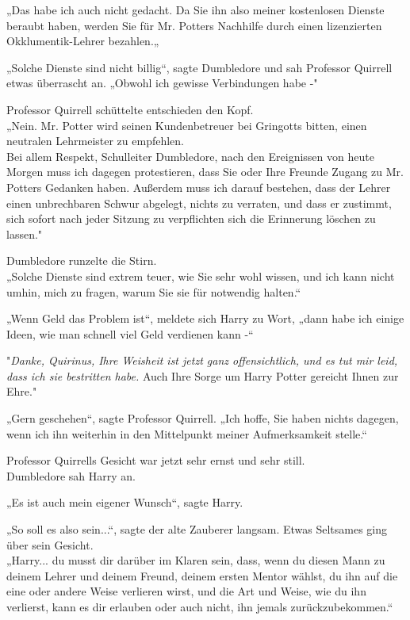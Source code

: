 {„Das habe ich auch nicht gedacht. Da Sie ihn also meiner kostenlosen Dienste beraubt haben, werden Sie für Mr. Potters Nachhilfe durch einen lizenzierten Okklumentik-Lehrer bezahlen.„

„Solche Dienste sind nicht billig“, sagte Dumbledore und sah Professor Quirrell etwas überrascht an. „Obwohl ich gewisse Verbindungen habe -"

Professor Quirrell schüttelte entschieden den Kopf.\\ „Nein. Mr. Potter wird seinen Kundenbetreuer bei Gringotts bitten, einen neutralen Lehrmeister zu empfehlen.\\ Bei allem Respekt, Schulleiter Dumbledore, nach den Ereignissen von heute Morgen muss ich dagegen protestieren, dass Sie oder Ihre Freunde Zugang zu Mr. Potters Gedanken haben. Außerdem muss ich darauf bestehen, dass der Lehrer einen unbrechbaren Schwur abgelegt, nichts zu verraten, und dass er zustimmt, sich sofort nach jeder Sitzung zu verpflichten sich die Erinnerung löschen zu lassen."

Dumbledore runzelte die Stirn.\\ „Solche Dienste sind extrem teuer, wie Sie sehr wohl wissen, und ich kann nicht umhin, mich zu fragen, warum Sie sie für notwendig halten.“

„Wenn Geld das Problem ist“, meldete sich Harry zu Wort, „dann habe ich einige Ideen, wie man schnell viel Geld verdienen kann -“

"\emph{Danke, Quirinus, Ihre Weisheit ist jetzt ganz offensichtlich, und es tut mir leid, dass ich sie bestritten habe.} Auch Ihre Sorge um Harry Potter gereicht Ihnen zur Ehre."

„Gern geschehen“, sagte Professor Quirrell. „Ich hoffe, Sie haben nichts dagegen, wenn ich ihn weiterhin in den Mittelpunkt meiner Aufmerksamkeit stelle.“

Professor Quirrells Gesicht war jetzt sehr ernst und sehr still.\\ Dumbledore sah Harry an.

„Es ist auch mein eigener Wunsch“, sagte Harry.

„So soll es also sein...“, sagte der alte Zauberer langsam. Etwas Seltsames ging über sein Gesicht.\\ „Harry... du musst dir darüber im Klaren sein, dass, wenn du diesen Mann zu deinem Lehrer und deinem Freund, deinem ersten Mentor wählst, du ihn auf die eine oder andere Weise verlieren wirst, und die Art und Weise, wie du ihn verlierst, kann es dir erlauben oder auch nicht, ihn jemals zurückzubekommen.“

}

